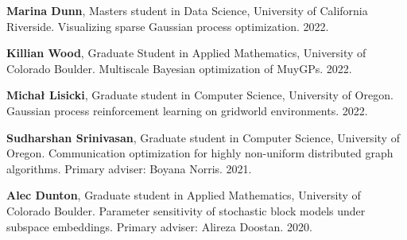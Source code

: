 \begin{innerlist}

\item[] \textbf{Marina Dunn},
	Masters student in Data Science,
	University of California Riverside.
	Visualizing sparse Gaussian process optimization.
	2022.
	
\item[] \textbf{Killian Wood},
	Graduate Student in Applied Mathematics,
	University of Colorado Boulder.
	Multiscale Bayesian optimization of MuyGPs.
	2022.

\item[] \textbf{Micha{\l} Lisicki},
      Graduate student in Computer Science,
      University of Oregon.
      Gaussian process reinforcement learning on gridworld environments.
      2022.


\item[] \textbf{Sudharshan Srinivasan},
      Graduate student in Computer Science,
      University of Oregon.
      Communication optimization for highly non-uniform distributed graph algorithms.
      Primary adviser: Boyana Norris.
      2021.

\item[] \textbf{Alec Dunton},
      Graduate student in Applied Mathematics,
      University of Colorado Boulder.
      Parameter sensitivity of stochastic block models under subspace embeddings.
      Primary adviser: Alireza Doostan.
      2020.

\end{innerlist}
